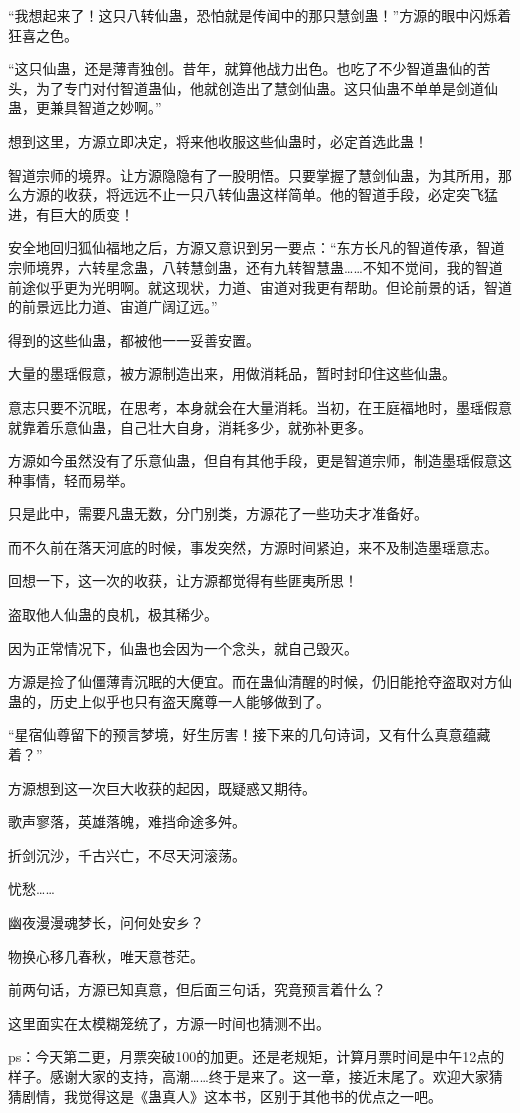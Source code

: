 \begin{this_body}
“我想起来了！这只八转仙蛊，恐怕就是传闻中的那只慧剑蛊！”方源的眼中闪烁着狂喜之色。

“这只仙蛊，还是薄青独创。昔年，就算他战力出色。也吃了不少智道蛊仙的苦头，为了专门对付智道蛊仙，他就创造出了慧剑仙蛊。这只仙蛊不单单是剑道仙蛊，更兼具智道之妙啊。”

想到这里，方源立即决定，将来他收服这些仙蛊时，必定首选此蛊！

智道宗师的境界。让方源隐隐有了一股明悟。只要掌握了慧剑仙蛊，为其所用，那么方源的收获，将远远不止一只八转仙蛊这样简单。他的智道手段，必定突飞猛进，有巨大的质变！

安全地回归狐仙福地之后，方源又意识到另一要点：“东方长凡的智道传承，智道宗师境界，六转星念蛊，八转慧剑蛊，还有九转智慧蛊……不知不觉间，我的智道前途似乎更为光明啊。就这现状，力道、宙道对我更有帮助。但论前景的话，智道的前景远比力道、宙道广阔辽远。”

得到的这些仙蛊，都被他一一妥善安置。

大量的墨瑶假意，被方源制造出来，用做消耗品，暂时封印住这些仙蛊。

意志只要不沉眠，在思考，本身就会在大量消耗。当初，在王庭福地时，墨瑶假意就靠着乐意仙蛊，自己壮大自身，消耗多少，就弥补更多。

方源如今虽然没有了乐意仙蛊，但自有其他手段，更是智道宗师，制造墨瑶假意这种事情，轻而易举。

只是此中，需要凡蛊无数，分门别类，方源花了一些功夫才准备好。

而不久前在落天河底的时候，事发突然，方源时间紧迫，来不及制造墨瑶意志。

回想一下，这一次的收获，让方源都觉得有些匪夷所思！

盗取他人仙蛊的良机，极其稀少。

因为正常情况下，仙蛊也会因为一个念头，就自己毁灭。

方源是捡了仙僵薄青沉眠的大便宜。而在蛊仙清醒的时候，仍旧能抢夺盗取对方仙蛊的，历史上似乎也只有盗天魔尊一人能够做到了。

“星宿仙尊留下的预言梦境，好生厉害！接下来的几句诗词，又有什么真意蕴藏着？”

方源想到这一次巨大收获的起因，既疑惑又期待。

歌声寥落，英雄落魄，难挡命途多舛。

折剑沉沙，千古兴亡，不尽天河滚荡。

忧愁……

幽夜漫漫魂梦长，问何处安乡？

物换心移几春秋，唯天意苍茫。

前两句话，方源已知真意，但后面三句话，究竟预言着什么？

这里面实在太模糊笼统了，方源一时间也猜测不出。

ps：今天第二更，月票突破100的加更。还是老规矩，计算月票时间是中午12点的样子。感谢大家的支持，高潮……终于是来了。这一章，接近末尾了。欢迎大家猜猜剧情，我觉得这是《蛊真人》这本书，区别于其他书的优点之一吧。

\end{this_body}

